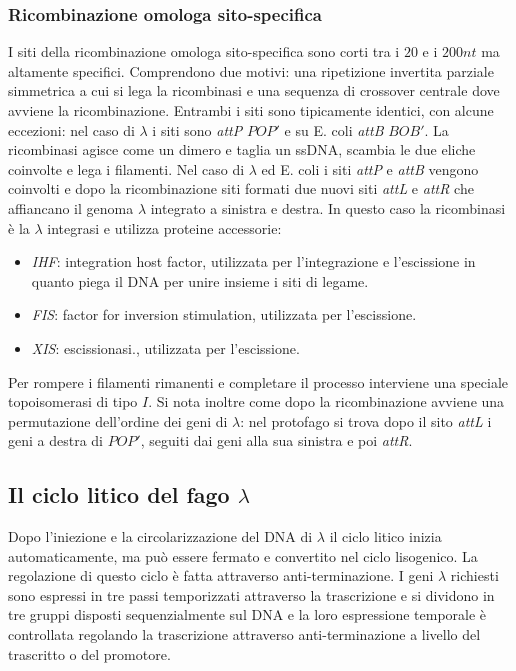 \subsubsection{Ricombinazione omologa sito-specifica}
I siti della ricombinazione omologa sito-specifica sono corti tra i $20$ e i $200nt$ ma altamente specifici. Comprendono due motivi: una ripetizione invertita parziale simmetrica a cui
si lega la ricombinasi e una sequenza di crossover centrale dove avviene la ricombinazione. Entrambi i siti sono tipicamente identici, con alcune eccezioni: nel caso di $\lambda$ 
i siti sono \emph{attP} $POP'$ e su E. coli \emph{attB} $BOB'$. La ricombinasi agisce come un dimero e taglia un ssDNA, scambia le due eliche coinvolte e lega i filamenti. Nel 
caso di $\lambda$ ed E. coli i siti \emph{attP} e \emph{attB} vengono coinvolti e dopo la ricombinazione siti formati due nuovi siti \emph{attL} e \emph{attR} che affiancano il 
genoma $\lambda$ integrato a sinistra e destra. In questo caso la ricombinasi \`e la $\lambda$ integrasi e utilizza proteine accessorie: 
\begin{itemize}
	\item \emph{IHF}: integration host factor, utilizzata per l'integrazione e l'escissione in quanto piega il DNA per unire insieme i siti di legame. 
	\item \emph{FIS}: factor for inversion stimulation, utilizzata per l'escissione.
	\item \emph{XIS}: escissionasi., utilizzata per l'escissione. 
\end{itemize}
Per rompere i filamenti rimanenti e completare il processo interviene una speciale topoisomerasi di tipo $I$. Si nota inoltre come dopo la ricombinazione avviene una permutazione 
dell'ordine dei geni di $\lambda$: nel protofago si trova dopo il sito \emph{attL} i geni a destra di $POP'$, seguiti dai geni alla sua sinistra e poi \emph{attR}. 
\subsection{Il ciclo litico del fago $\lambda$}
Dopo l'iniezione e la circolarizzazione del DNA di $\lambda$ il ciclo litico inizia automaticamente, ma pu\`o essere fermato e convertito nel ciclo lisogenico. La regolazione di questo
ciclo \`e fatta attraverso anti-terminazione. I geni $\lambda$ richiesti sono espressi in tre passi temporizzati attraverso la trascrizione e si dividono in tre gruppi disposti 
sequenzialmente sul DNA e la loro espressione temporale \`e controllata regolando la trascrizione attraverso anti-terminazione a livello del trascritto o del promotore. 
